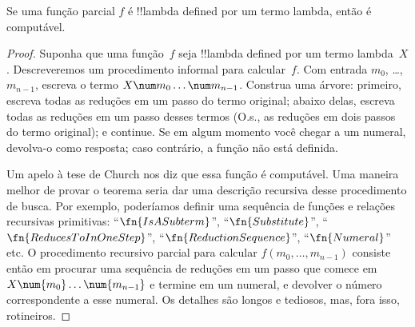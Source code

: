 \documentclass[../../../include/open-logic-section]{subfiles}
\begin{document}

\begin{thm}
Se uma função parcial $f$ é !!{lambda defined} por um termo lambda, então é
computável.
\end{thm}

\begin{proof}
Suponha que uma função~$f$ seja !!{lambda defined} por um termo lambda~$X$.
Descreveremos um procedimento informal para calcular~$f$. Com entrada
$m_0$, \dots,~$m_{n-1}$, escreva o termo $X \num m_0 \ldots \num
m_{n-1}$. Construa uma árvore: primeiro, escreva todas as reduções em um
passo do termo original; abaixo delas, escreva todas as reduções em um passo
desses termos (O.s.\@, as reduções em dois passos do termo original); e
continue. Se em algum momento você chegar a um numeral, devolva-o como
resposta; caso contrário, a função não está definida.

Um apelo à tese de Church nos diz que essa função é computável. Uma maneira
melhor de provar o teorema seria dar uma descrição recursiva desse
procedimento de busca. Por exemplo, poderíamos definir uma sequência de
funções e relações recursivas primitivas: ``$\fn{IsASubterm}$'',
``$\fn{Substitute}$'', ``$\fn{ReducesToInOneStep}$'',
``$\fn{ReductionSequence}$'', ``$\fn{Numeral}$'' etc. O procedimento
recursivo parcial para calcular $f(m_0, \dots, m_{n-1})$ consiste então em
procurar uma sequência de reduções em um passo que comece em
$X \num{m_0} \dots \num{m_{n-1}}$ e termine em um numeral, e devolver o
número correspondente a esse numeral. Os detalhes são longos e tediosos,
mas, fora isso, rotineiros.
\end{proof}
\end{document}

